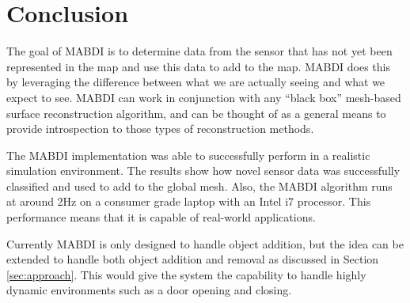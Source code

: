 \section{Conclusion} \label{sec:conclusion}

The goal of MABDI is to determine data from the sensor that has not yet been
represented in the map and use this data to add to the map. MABDI does this by
leveraging the difference between what we are actually seeing and what we expect
to see. MABDI can work in conjunction with any ``black box'' mesh-based surface
reconstruction algorithm, and can be thought of as a general means to provide
introspection to those types of reconstruction methods.

 The MABDI implementation was able to successfully perform in a realistic
 simulation environment. The results show how novel sensor data was
 successfully classified and used to add to the global mesh. Also, the MABDI
 algorithm runs at around 2Hz on a consumer grade laptop with an Intel i7
 processor. This performance means that it is capable of real-world
 applications.

 Currently MABDI is only designed to handle object addition, but the idea can be
 extended to handle both object addition and removal as discussed in Section
 \ref{sec:approach}. This would give the system the capability to handle highly
 dynamic environments such as a door opening and closing.
